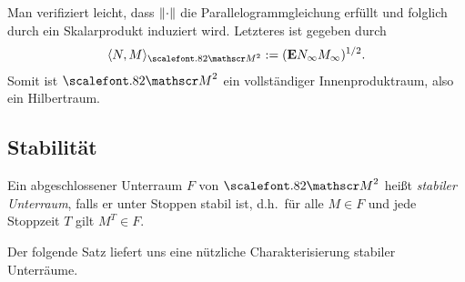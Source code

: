 Man verifiziert leicht, dass $\lVert\cdot\rVert$ die Parallelogrammgleichung erfüllt
und folglich durch ein Skalarprodukt induziert wird. Letzteres ist gegeben durch
\begin{align*}
\lin{N,M}_{\MM^2} \defl (\E N_\infty M_\infty)^{1/2}.
\end{align*}
Somit ist $\MM^2$ ein vollständiger Innenproduktraum, also ein Hilbertraum.

\subsection{Stabilität}

\begin{definition}
\label{defn:5.2}
Ein abgeschlossener Unterraum $F$ von $\MM^2$ heißt \emph{stabiler Unterraum},
falls er unter Stoppen stabil ist, d.h.\ für alle $M\in F$ und jede Stoppzeit
$T$ gilt $M^T \in F$.\fish
\end{definition}

Der folgende Satz liefert uns eine nützliche Charakterisierung stabiler
Unterräume.

